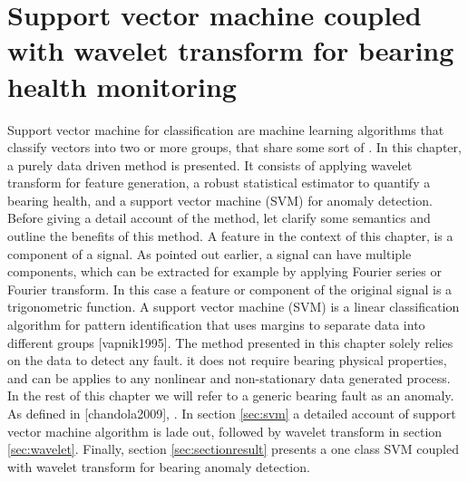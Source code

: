 \documentclass[../Main/thesis.tex]{subfiles}
\begin{document}
\chapter[Support vector machine coupled with wavelet transform for bearing health monitoring]{Support vector machine coupled with wavelet transform for bearing health monitoring}
\label{sec:waveletandsvm}
Support vector machine for classification are machine learning algorithms that classify vectors into two or more groups, that share some sort of .
\justify
In this chapter, a purely data driven method is presented. It consists of applying wavelet transform for feature generation, a robust statistical estimator to quantify a bearing health, and a support vector machine (SVM) for anomaly detection. Before giving a detail account of the method, let clarify some semantics and outline the benefits of this method. A feature in the context of this chapter, is a component of a signal. As pointed out earlier, a signal can have multiple components, which can be extracted for example by applying Fourier series or Fourier transform. In this case a feature or component of the original signal is a trigonometric function. A support vector machine (SVM) is a linear classification algorithm for pattern identification that uses margins to separate data into different groups [vapnik1995].
\justify
The method presented in this chapter solely relies on the data to detect any fault. it does not require bearing physical properties, and can be applies to any nonlinear and non-stationary data generated process. In the rest of this chapter we will refer to a generic bearing fault as an anomaly. As defined in [chandola2009], . In section \ref{sec:svm} a detailed account of support vector machine algorithm is lade out, followed by wavelet transform in section \ref{sec:wavelet}. Finally, section \ref{sec:sectionresult} presents a one class SVM coupled with wavelet transform for bearing anomaly detection.
\end{document}

